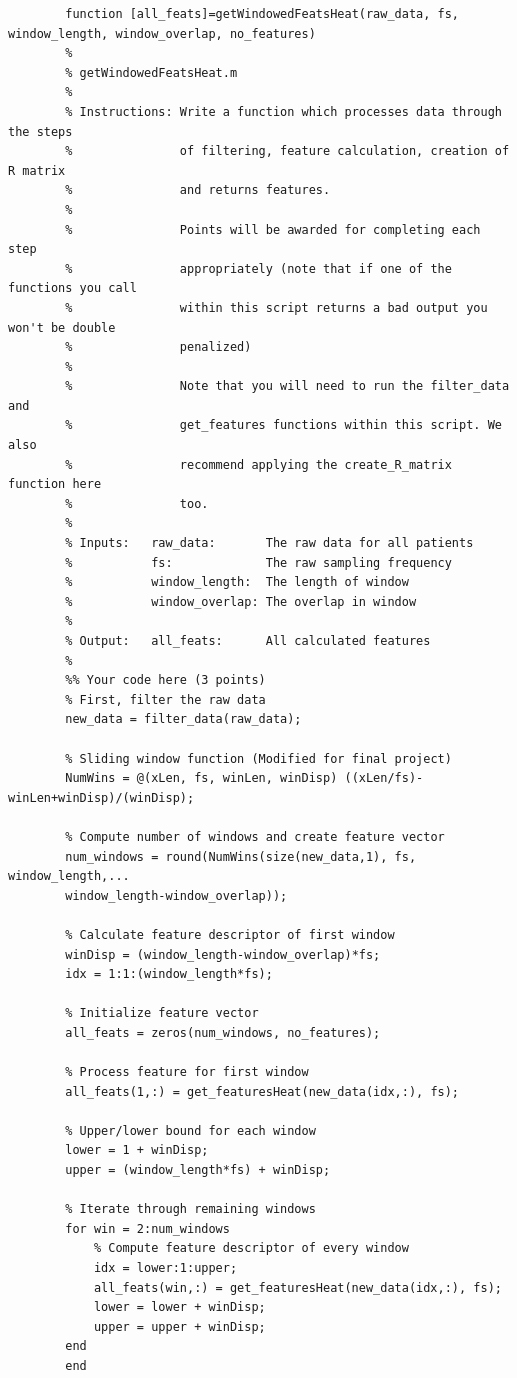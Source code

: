 \documentclass{article}
\newcounter{number}
\begin{document}
	\begin{lstlisting}
		function [all_feats]=getWindowedFeatsHeat(raw_data, fs, window_length, window_overlap, no_features)
		%
		% getWindowedFeatsHeat.m
		%
		% Instructions: Write a function which processes data through the steps
		%               of filtering, feature calculation, creation of R matrix
		%               and returns features.
		%
		%               Points will be awarded for completing each step
		%               appropriately (note that if one of the functions you call
		%               within this script returns a bad output you won't be double
		%               penalized)
		%
		%               Note that you will need to run the filter_data and
		%               get_features functions within this script. We also 
		%               recommend applying the create_R_matrix function here
		%               too.
		%
		% Inputs:   raw_data:       The raw data for all patients
		%           fs:             The raw sampling frequency
		%           window_length:  The length of window
		%           window_overlap: The overlap in window
		%
		% Output:   all_feats:      All calculated features
		%
		%% Your code here (3 points)
		% First, filter the raw data
		new_data = filter_data(raw_data);

		% Sliding window function (Modified for final project)
		NumWins = @(xLen, fs, winLen, winDisp) ((xLen/fs)-winLen+winDisp)/(winDisp); 

		% Compute number of windows and create feature vector
		num_windows = round(NumWins(size(new_data,1), fs, window_length,...
		window_length-window_overlap));

		% Calculate feature descriptor of first window
		winDisp = (window_length-window_overlap)*fs;
		idx = 1:1:(window_length*fs);

		% Initialize feature vector
		all_feats = zeros(num_windows, no_features);

		% Process feature for first window
		all_feats(1,:) = get_featuresHeat(new_data(idx,:), fs);

		% Upper/lower bound for each window
		lower = 1 + winDisp;
		upper = (window_length*fs) + winDisp;

		% Iterate through remaining windows
		for win = 2:num_windows
		    % Compute feature descriptor of every window
		    idx = lower:1:upper;
		    all_feats(win,:) = get_featuresHeat(new_data(idx,:), fs);
		    lower = lower + winDisp;
		    upper = upper + winDisp;
		end
		end
	\end{lstlisting}
	
\end{document}
